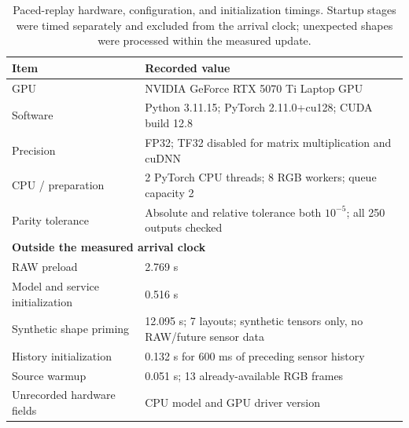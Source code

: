 \begin{table}[H]\centering\small
\caption{Paced-replay hardware, configuration, and initialization timings. Startup stages were timed separately and excluded from the arrival clock; unexpected shapes were processed within the measured update. }
\label{tab:runtime-setup}
\begin{tabularx}{\linewidth}{@{}p{.31\linewidth}X@{}}\toprule
Item & Recorded value\\\midrule
GPU & NVIDIA GeForce RTX 5070 Ti Laptop GPU\\
Software & Python 3.11.15; PyTorch 2.11.0+cu128; CUDA build 12.8\\
Precision & FP32; TF32 disabled for matrix multiplication and cuDNN\\
CPU / preparation & 2 PyTorch CPU threads; 8 RGB workers; queue capacity 2\\
Parity tolerance & Absolute and relative tolerance both $10^{-5}$; all 250 outputs checked\\
\midrule\multicolumn{2}{l}{\textbf{Outside the measured arrival clock}}\\
RAW preload & 2.769 s\\
Model and service initialization & 0.516 s\\
Synthetic shape priming & 12.095 s; 7 layouts; synthetic tensors only, no RAW/future sensor data\\
History initialization & 0.132 s for 600 ms of preceding sensor history\\
Source warmup & 0.051 s; 13 already-available RGB frames\\
\midrule
Unrecorded hardware fields & CPU model and GPU driver version\\
\bottomrule\end{tabularx}\end{table}
